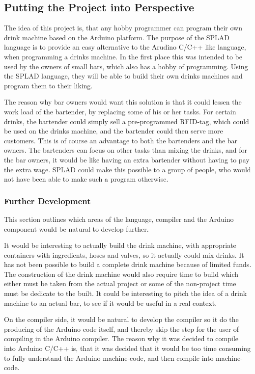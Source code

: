 \subsection{Putting the Project into Perspective}
The idea of this project is, that any hobby programmer can program their own drink machine based on the Arduino platform. The purpose of the SPLAD language is to provide an easy alternative to the Arudino C/C++ like language, when programming a drinks machine. In the first place this was intended to be used by the owners of small bars, which also has a hobby of programming. Using the SPLAD language, they will be able to build their own drinks machines and program them to their liking.

The reason why bar owners would want this solution is that it could lessen the work load of the bartender, by replacing some of his or her tasks. For certain drinks, the bartender could simply sell a pre-programmed RFID-tag, which could be used on the drinks machine, and the bartender could then serve more customers. This is of course an advantage to both the bartenders and the bar owners. The bartenders can focus on other tasks than mixing the drinks, and for the bar owners, it would be like having an extra bartender without having to pay the extra wage. 
SPLAD could make this possible to a group of people, who would not have been able to make such a program otherwise.

\subsubsection{Further Development}
This section outlines which areas of the language, compiler and the Arduino component would be natural to develop further.

It would be interesting to actually build the drink machine, with appropriate containers with ingredients, hoses and valves, so it actually could mix drinks. It has not been possible to build a complete drink machine because of limited funds. The construction of the drink machine would also require time to build which either must be taken from the actual project or some of the non-project time must be dedicate to the built. It could be interesting to pitch the idea of a drink machine to an actual bar, to see if it would be useful in a real context.

On the compiler side, it would be natural to develop the compiler so it do the producing of the Arduino code itself, and thereby skip the step for the user of compiling in the Arduino compiler. The reason why it was decided to compile into Arduino C/C++ is, that it was decided that it would be too time consuming to fully understand the Arduino machine-code, and then compile into machine-code.

